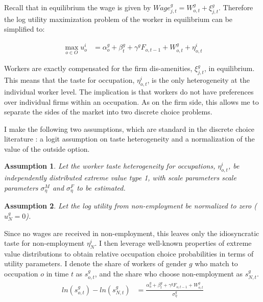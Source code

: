 \documentclass[12pt]{article}
\newtheorem{assumption}{Assumption}
\begin{document}
Recall that in equilibrium the wage is given by  $Wage^g_{j,t} = W^g_{o,t} + \xi^g_{j,t}$. Therefore the log utility maximization problem of the worker in equilibrium can be simplified to:

\begin{align} \label{utility}
\max_{o \in O} u^i_o &=   \alpha^g_o + \beta^g_t  + \gamma^g F_{o,t-1} + W^g_{o,t}  + \eta^i_{o,t}
\end{align}

Workers are exactly compensated for the firm dis-amenities, $ \xi^g_{j,t}$, in equilibrium. This means that the taste for occupation, $\eta^i_{o,t}$, is the only heterogeneity at the individual worker level. The implication is that workers do not have preferences over individual firms within an occupation. As on the firm side, this allows me to separate the sides of the market into two discrete choice problems.

I make the following two assumptions, which are standard in the discrete choice literature \cite{Berry1994}: a logit assumption on taste heterogeneity and a normalization of the value of the outside option.

\begin{assumption}
Let the worker taste heterogeneity for occupations, $\eta^i_{o,t}$, be independently distributed extreme value type 1, with scale parameters scale parameters $\sigma^M_{\eta}$ and $\sigma^F_{\eta}$ to be estimated.
\end{assumption}


\begin{assumption}
Let the log utility from non-employment be normalized to zero ($u^g_N=0$). 
\end{assumption}


Since no wages are received in non-employment, this leaves only the idiosyncratic taste for non-employment $\eta^i_N$. I then leverage well-known properties of extreme value distributions to obtain relative occupation choice probabilities in terms of utility parameters. I denote the share of workers of gender $g$ who match to occupation $o$ in time $t$ as $s^g_{o,t}$, and  the share who choose non-employment as $s^g_{N,t}$.
\begin{equation} \label{eq:1}
\begin{split}
ln(s^g_{o,t}) - ln(s^g_{N,t}) &=  \frac{\alpha^{g}_o + \beta^g_t + \gamma^g F_{o,t-1}  + W^g_{o,t}}{ \sigma^g_{\eta} } 
 \end{split}
\end{equation}
\end{document}
